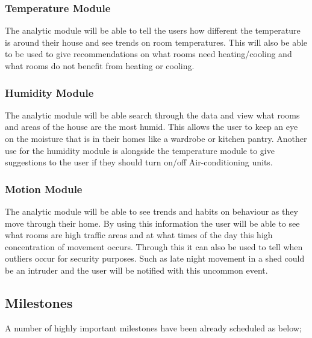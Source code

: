 \documentclass{article}
\begin{document}
            \subsubsection{Temperature Module}
                The analytic module will be able to tell the users how different the temperature is around their house and see trends on room temperatures. This will also be able to be used to give recommendations on what rooms need heating/cooling and what rooms do not benefit from heating or cooling.
            \subsubsection{Humidity Module}
                The analytic module will be able search through the data and view what rooms and areas of the house are the most humid. This allows the user to keep an eye on the moisture that is in their homes like a wardrobe or kitchen pantry. Another use for the humidity module is alongside the temperature module to give suggestions to the user if they should turn on/off Air-conditioning units.
            \subsubsection{Motion Module}
                The analytic module will be able to see trends and habits on behaviour as they move through their home. By using this information the user will be able to see what rooms are high traffic areas and at what times of the day this high concentration of movement occurs. Through this it can also be used to tell when outliers occur for security purposes. Such as late night movement in a shed could be an intruder and the user will be notified with this uncommon event.

            \newpage

        \subsection{Milestones}
        A number of highly important milestones have been already scheduled as below;
\end{document}
